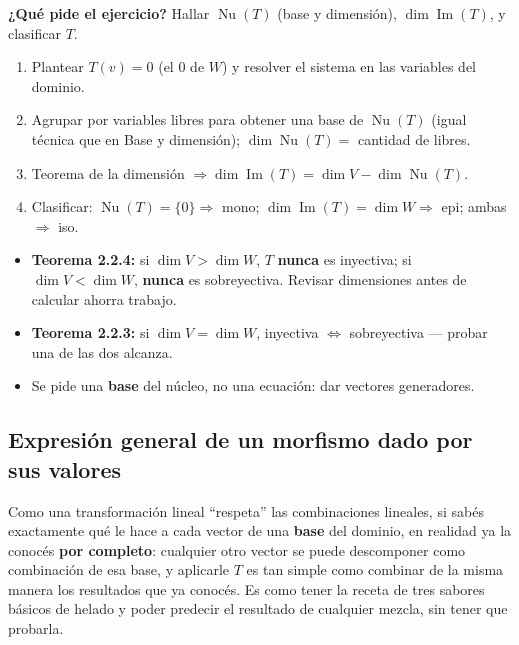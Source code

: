 \documentclass[11pt,a4paper]{article}
\newcommand{\qpide}[1]{\textbf{¿Qué pide el ejercicio?} #1\par}
\begin{document}
\qpide{Hallar $\operatorname{Nu}(T)$ (base y dimensión), $\dim\operatorname{Im}(T)$, y
clasificar $T$.}

\begin{proc}
\begin{enumerate}
    \item Plantear $T(v)=0$ (el $0$ de $W$) y resolver el sistema en las variables del
    dominio.
    \item Agrupar por variables libres para obtener una base de $\operatorname{Nu}(T)$
    (igual técnica que en Base y dimensión); $\dim\operatorname{Nu}(T)=$ cantidad de
    libres.
    \item Teorema de la dimensión $\Rightarrow \dim\operatorname{Im}(T)=\dim V-\dim
    \operatorname{Nu}(T)$.
    \item Clasificar: $\operatorname{Nu}(T)=\{0\}\Rightarrow$ mono;
    $\dim\operatorname{Im}(T)=\dim W\Rightarrow$ epi; ambas $\Rightarrow$ iso.
\end{enumerate}
\end{proc}

\begin{atencion}
\begin{itemize}
    \item \textbf{Teorema 2.2.4:} si $\dim V>\dim W$, $T$ \textbf{nunca} es inyectiva; si
    $\dim V<\dim W$, \textbf{nunca} es sobreyectiva. Revisar dimensiones antes de calcular
    ahorra trabajo.
    \item \textbf{Teorema 2.2.3:} si $\dim V=\dim W$, inyectiva $\Leftrightarrow$
    sobreyectiva — probar una de las dos alcanza.
    \item Se pide una \textbf{base} del núcleo, no una ecuación: dar vectores generadores.
\end{itemize}
\end{atencion}

\subsection{Expresión general de un morfismo dado por sus valores}

\begin{intuicion}
Como una transformación lineal ``respeta'' las combinaciones lineales, si sabés
exactamente qué le hace a cada vector de una \textbf{base} del dominio, en realidad ya la
conocés \textbf{por completo}: cualquier otro vector se puede descomponer como combinación
de esa base, y aplicarle $T$ es tan simple como combinar de la misma manera los
resultados que ya conocés. Es como tener la receta de tres sabores básicos de helado y
poder predecir el resultado de cualquier mezcla, sin tener que probarla.
\end{intuicion}
\end{document}
